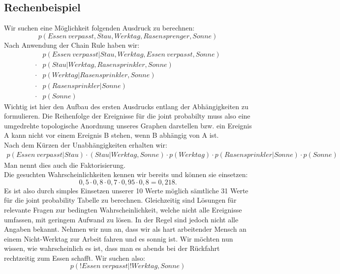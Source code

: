 \subsection{Rechenbeispiel}
Wir suchen eine Möglichkeit folgenden Ausdruck zu berechnen:
\begin{equation*}
p(Essen ~verpasst,Stau,Werktag,Rasensprenger,Sonne)
\end{equation*}
Nach Anwendung der Chain Rule haben wir:
\begin{align*}
& p( Essen ~verpasst | Stau , Werktag, Essen ~verpasst, Sonne )\\
\cdot & p( Stau | Werktag , Rasensprinkler, Sonne )\\
\cdot & p( Werktag | Rasensprinkler, Sonne )\\
\cdot & p( Rasensprinkler | Sonne )\\
\cdot & p( Sonne )
\end{align*}
Wichtig ist hier den Aufbau des ersten Ausdrucks entlang der Abhängigkeiten zu formulieren. Die Reihenfolge der Ereignisse für die joint probabilty muss also eine umgedrehte topologische Anordnung unseres Graphen darstellen bzw. ein Ereignis A kann nicht vor einem Ereignis B stehen, wenn B abhängig von A ist.\\
Nach dem Kürzen der Unabhängigkeiten erhalten wir:
\begin{align*}
p(Essen ~verpasst | Stau ) 
\cdotp( Stau | Werktag, Sonne)
\cdot p(Werktag) 
\cdot p(Rasensprinkler | Sonne)
\cdot p(Sonne)
\end{align*}
Man nennt dies auch die Faktorisierung.\\
Die gesuchten Wahrscheinlichkeiten kennen wir bereits und können sie einsetzen:
\begin{equation*}
0,5 \cdot 0,8 \cdot 0,7 \cdot 0,95 \cdot 0,8 = 0,218.
\end{equation*}
%
Es ist also durch simples Einsetzen unserer 10 Werte möglich sämtliche 31 Werte für die joint probability Tabelle zu berechnen.
Gleichzeitig sind Lösungen für relevante Fragen zur bedingten Wahrscheinlichkeit, welche nicht alle Ereignisse umfassen, mit geringem Aufwand zu lösen.
%
In der Regel sind jedoch nicht alle Angaben bekannt.
Nehmen wir nun an, dass wir als hart arbeitender Mensch an einem Nicht-Werktag zur Arbeit fahren und es sonnig ist.
Wir möchten nun wissen, wie wahrscheinlich es ist, dass man es abends bei der Rückfahrt rechtzeitig zum Essen schafft.
Wir suchen also:
\begin{equation*}
p(!Essen ~verpasst | !Werktag, Sonne)
\end{equation*}
